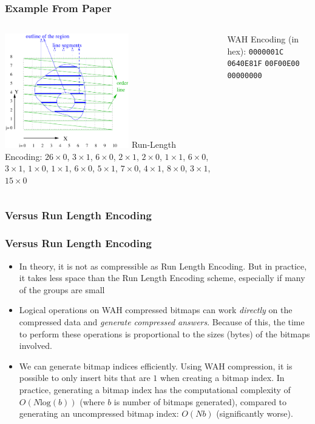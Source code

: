 \documentclass[11pt]{beamer}
\begin{document}
\begin{frame}
	\frametitle{Example From Paper}
	
	\begin{columns}[c]
		\includegraphics[height=5cm]{example_grid.png}
		\pause
		Run-Length Encoding: $26 \times 0$, $3 \times 1$, $6 \times 0$, $2 \times 1$, $2 \times 0$, $1 \times 1$, $6 \times 0$, $3 \times 1$, $1 \times 0$, $1 \times 1$, $6 \times 0$, $5 \times 1$, $7 \times 0$, $4 \times 1$, $8 \times 0$, $3 \times 1$, $15 \times 0$
		
		\pause
		WAH Encoding (in hex): \texttt{0000001C} \texttt{0640E81F} \texttt{00F00E00} \texttt{00000000}
	\end{columns}
\end{frame}

\subsubsection[Word-Aligned Hybrid]{Versus Run Length Encoding}
\begin{frame}
	\frametitle{Versus Run Length Encoding}
	
	\begin{itemize}
		\item In theory, it is not as compressible as Run Length Encoding. \pause But in practice, it takes less space than the Run Length Encoding scheme, especially if many of the groups are small
		
		\pause
		\item Logical operations on WAH compressed bitmaps can work \textit{directly} on the compressed data and \textit{generate compressed answers}. Because of this, the time to perform these operations is proportional to the sizes (bytes) of the bitmaps involved.
		
		\pause
		\item We can generate bitmap indices efficiently. Using WAH compression, it is possible to only insert bits that are $1$ when creating a bitmap index. In practice, generating a bitmap index has the computational complexity of $O(N \text{log}(b))$ (where $b$ is number of bitmaps generated), compared to generating an uncompressed bitmap index: $O(Nb)$ (significantly worse).
	\end{itemize}
\end{frame}
\end{document}
